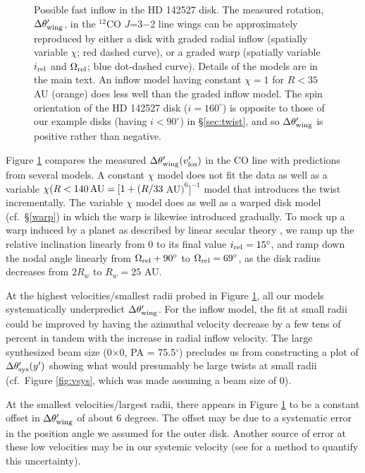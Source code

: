 \begin{figure}[t!]
\caption{Possible fast inflow in the HD 142527 disk.  The measured rotation,
$\Delta\theta'_{\rm wing}$, in the $^{12}$CO $J$=3$-$2 line wings can be 
approximately reproduced by either a disk with graded radial
inflow (spatially variable $\chi$; red dashed curve), or a graded warp 
(spatially variable $i_{\rm rel}$ and $\Omega_{\rm rel}$; blue dot-dashed 
curve).  Details of the 
models are in the main text.  An inflow model having constant $\chi = 1$ for $R 
< 35$ AU (orange) does less well than the graded inflow model.  The spin 
orientation of the HD 142527 disk ($i = 160^\circ$) is opposite to those of our 
example disks (having $i < 90^\circ$) in \S\ref{sec:twist}, and so 
$\Delta\theta'_{\rm wing}$ is positive rather than negative.  
\label{fig:hd142527_rot}}
\end{figure}

Figure \ref{fig:hd142527_rot} compares the measured $\Delta\theta'_{\rm wing} 
(v'_{\rm los})$ in the CO line with predictions from several models.  A 
constant $\chi$ model does not fit the data as well as a variable $\chi (R < 
140 \, {\rm AU} = [1+(R/33$\,AU$)^6]^{-1}$ model that introduces the twist
incrementally.  The variable $\chi$ model does as well as a warped disk model 
(cf.~\S\ref{warp}) in which the warp is likewise introduced gradually.  To mock 
up a warp induced by a planet as described by linear secular theory 
\citep[e.g.,][]{dawson11}, we ramp up the relative inclination linearly from 0 
to its final value $i_{\rm rel} = 15^\circ$, and ramp down the nodal angle 
linearly from $\Omega_{\rm rel} + 90^\circ$ to $\Omega_{\rm rel} = 69^\circ$, as 
the disk radius decreases from $2R_w$ to $R_w = 25$ AU.

At the highest velocities/smallest radii probed in Figure 
\ref{fig:hd142527_rot}, all our models systematically underpredict $\Delta 
\theta'_{\rm wing}$.
For the inflow model, the fit at small radii could be improved by having the 
azimuthal velocity decrease by a few tens of percent in tandem with the 
increase in radial inflow velocity.  The large synthesized beam size 
(0$\times$0, PA = 75.5$^\circ$) precludes us from constructing 
a plot of $\Delta \theta'_{\rm sys} (y')$ showing what would presumably be 
large twists at small radii (cf.~Figure \ref{fig:vsys}, which was made assuming 
a beam size of 0).

At the smallest velocities/largest radii, there appears in Figure
\ref{fig:hd142527_rot} to be a constant offset in $\Delta \theta'_{\rm
  wing}$ of about 6 degrees. The offset may be due to a systematic
error in the position angle we assumed for the outer disk.  Another
source of error at these low velocities may be in our systemic
velocity (see \citealt{hughes11} for a method to quantify this
uncertainty).


